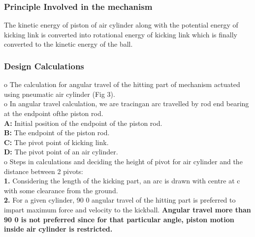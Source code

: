         \subsubsection{Principle Involved in the mechanism}
            The kinetic energy of piston of air cylinder along with the potential energy of kicking link is converted
            into rotational energy of kicking link which is finally converted to the kinetic energy of the ball.

        \subsubsection{Design Calculations}
            o The calculation for angular travel of the hitting part of mechanism actuated using pneumatic air cylinder (Fig 3).                    \\
            o In angular travel calculation, we are tracingan arc travelled by rod end bearing at the endpoint ofthe piston rod.                    \\
                \textbf{A:} Initial position of the endpoint of the piston rod.                                                                     \\
                \textbf{B:} The endpoint of the piston rod.                                                                                         \\
                \textbf{C:} The pivot point of kicking link.                                                                                        \\
                \textbf{D:} The pivot point of an air cylinder.                                                                                     \\
            o Steps in calculations and deciding the height of pivot for air cylinder and the distance between 2 pivots:                            \\
                \textbf{1.} Considering the length of the kicking part, an arc is drawn with centre at c with some clearance from the ground.    \\
                \textbf{2.} For a given cylinder, 90 0 angular travel of the hitting part is preferred to impart maximum force and velocity 
                            to the kickball. \textbf{Angular travel more than 90 0 is not preferred since for that particular angle, piston 
                            motion inside air cylinder is restricted.}                                                                           \\

